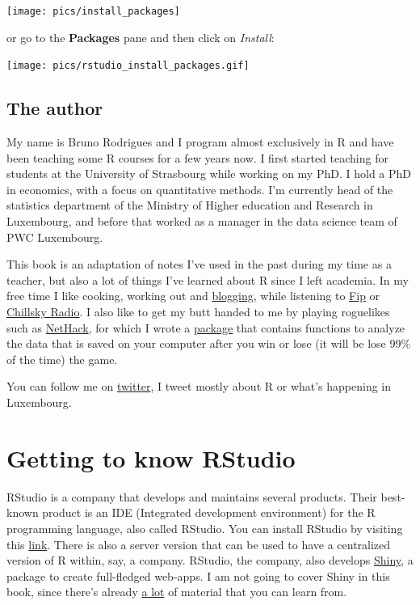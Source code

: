 \documentclass[
]{article}
\begin{document}
\texttt{[image: pics/install\_packages]}

or go to the \textbf{Packages} pane and then click on \emph{Install}:

\texttt{[image: pics/rstudio\_install\_packages.gif]}

\hypertarget{the-author}{%
\subsection*{The author}\label{the-author}}

My name is Bruno Rodrigues and I program almost exclusively in R and have been teaching some R
courses for a few years now. I first started teaching for students at the University of Strasbourg
while working on my PhD. I hold a PhD in economics, with a focus on quantitative methods.
I'm currently head of the statistics department of the Ministry of Higher education and Research
in Luxembourg, and before that worked as a manager in the data science team of PWC Luxembourg.

This book is an adaptation of notes I've used in the past during my time as a teacher, but also
a lot of things I've learned about R since I left academia.
In my free time I like cooking, working out and \href{https://www.brodrigues.co}{blogging}, while listening to
\href{http://www.fipradio.fr/player}{Fip} or
\href{https://chillsky.com/listen/}{Chillsky Radio}.
I also like to get my butt handed to me by playing roguelikes
such as \href{http://nethack.wikia.com/wiki/NetHack}{NetHack}, for which I wrote a
\href{https://github.com/b-rodrigues/nethack}{package} that contains functions to analyze the data that
is saved on your computer after you win or lose (it will be lose 99\% of the time) the game.

You can follow me on \href{https://www.twitter.com/brodriguesco}{twitter}, I tweet mostly about R or
what's happening in Luxembourg.

\hypertarget{getting-to-know-rstudio}{%
\section{Getting to know RStudio}\label{getting-to-know-rstudio}}

RStudio is a company that develops and maintains several products. Their best-known product is
an IDE (Integrated development environment) for the R programming language, also called RStudio.
You can install RStudio by visiting this \href{https://www.rstudio.com/products/rstudio/download/}{link}.
There is also a server version that can be used to have a centralized version of R within, say, a
company. RStudio, the company, also develops \href{https://shiny.rstudio.com/}{Shiny}, a package to
create full-fledged web-apps. I am not going to cover Shiny in this book, since there's already
\href{http://shiny.rstudio.com/tutorial/}{a lot} of material that you can learn from.
\end{document}
